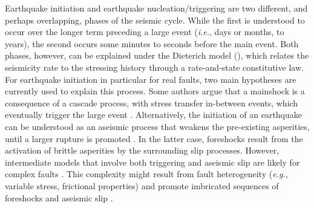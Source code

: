 \documentclass[a4paper,12pt,twoside]{article}
\begin{document}
Earthquake initiation \citep[\emph{e.g.}][]{Kato_2012_PSS, Schurr_2014_GUP, Tramutoli_2015_VCR} and earthquake nucleation/triggering \citep[\emph{e.g.}][]{Dieterich_1992_ENF, Ellsworth_1995_SEE, Rubin_2005_ENR} are two different, and perhaps overlapping, phases of the seismic cycle. While the first is understood to occur over the longer term preceding a large event (\emph{i.e.}, days or months, to years), the second occurs some minutes to seconds before the main event. Both phases, however, can be explained under the Dieterich model (\citeyear{Dieterich_1994_CLR}), which relates the seismicity rate to the stressing history through a rate-and-state constitutive law. For earthquake initiation in particular for real faults, two main hypotheses are currently used to explain this process. Some authors argue that a mainshock is a consequence of a cascade process, with stress transfer in-between events, which eventually trigger the large event \citep[\emph{e.g.},][]{Dodge_1996_DOC, Ellsworth_2018_NIE, Yoon_2019_FMN}. Alternatively, the initiation of an earthquake can be understood as an aseismic process that weakens the pre-existing asperities, until a larger rupture is promoted \citep{Dodge_1996_DOC, Bouchon_2011_ENI, Tape_2018_ENF}. In the latter case, foreshocks result from the activation of brittle asperities by the surrounding slip processes. However, intermediate models that involve both triggering and aseismic slip are likely for complex faults \citep[\emph{e.g.}][]{mclaskey2019earthquake}. This complexity might result from fault heterogeneity (\emph{e.g.}, variable stress, frictional properties) and promote imbricated sequences of foreshocks and aseismic slip \citep[\emph{e.g.},][]{dublanchet2018dynamics}.
\end{document}
